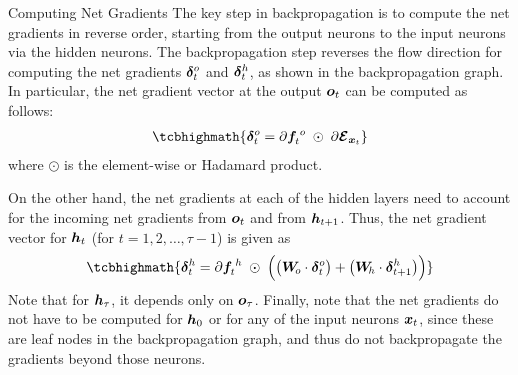 %
%
\begin{frame}{Computing Net Gradients}
The key step in backpropagation is to compute the net gradients in
reverse order, starting from the output neurons to the input neurons via
the hidden neurons. %
The backpropagation step reverses
the flow direction for computing the net gradients ${\bm \delta}^o_t$ and
${\bm \delta}^h_t$, as shown in the backpropagation graph.%
%
In particular, the net gradient vector at the output ${\boldsymbol o}_t$ can be
computed as follows:
\begin{align}
    \tcbhighmath{
\bdelta^o_t = \partial\bff^{\;o}_t \;\odot\; \partial\bcE_{\bx_t}}
\end{align}
where $\odot$ is the element-wise or Hadamard product.

On the other hand, the net gradients at each of the hidden layers
need to account for the incoming net gradients from ${\boldsymbol o}_t$ and from
${\boldsymbol h}_{t+1}$.%
Thus,
the net gradient vector for ${\boldsymbol h}_t$ (for $t=1,2,\ldots,\tau-1$) is given as
\begin{align}
    \tcbhighmath{
    \bdelta^h_t = \partial\bff^{\;h}_t \;\odot\; 
    \Bigl( \bigl(\bW_{\!o} \cdot \bdelta^o_t \bigr) + 
        \bigl(\bW_{\!h} \cdot \bdelta^h_{t+1}  \bigr)
\Bigr)}
\end{align}
Note that for ${\boldsymbol h}_\tau$, it depends only on ${\boldsymbol o}_\tau$.%
Finally, note that the net gradients do not have to be computed for ${\boldsymbol h}_0$
or for any
of the input neurons ${\boldsymbol x}_t$, since these are leaf nodes in the
backpropagation graph, and thus do not backpropagate the gradients beyond
those neurons.
\end{frame}
